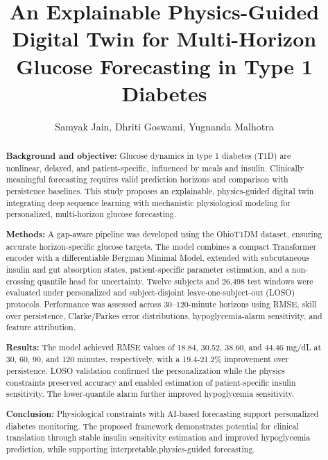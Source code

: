 \documentclass[journal]{IEEEtran}
\begin{document}
\raggedbottom

\title{An Explainable Physics-Guided Digital Twin for Multi-Horizon Glucose Forecasting in Type 1 Diabetes}

\author{
Samyak Jain,
Dhriti Goswami,
Yugnanda Malhotra
}

\maketitle

\begin{abstract}
\textbf{Background and objective:} Glucose dynamics in type 1 diabetes (T1D) are nonlinear, delayed, and patient-specific, influenced by meals and insulin. Clinically meaningful forecasting requires valid prediction horizons and comparison with persistence baselines. This study proposes an explainable, physics-guided digital twin integrating deep sequence learning with mechanistic physiological modeling for personalized, multi-horizon glucose forecasting.

\textbf{Methods:} A gap-aware pipeline was developed using the OhioT1DM dataset, ensuring accurate horizon-specific glucose targets. The model combines a compact Transformer encoder with a differentiable Bergman Minimal Model, extended with subcutaneous insulin and gut absorption states, patient-specific parameter estimation, and a non-crossing quantile head for uncertainty. Twelve subjects and 26,498 test windows were evaluated under personalized and subject-disjoint leave-one-subject-out (LOSO) protocols. Performance was assessed across 30–120-minute horizons using RMSE, skill over persistence, Clarke/Parkes error distributions, hypoglycemia-alarm sensitivity, and feature attribution.

\textbf{Results:} The model achieved RMSE values of 18.84, 30.52, 38.60, and 44.46 mg/dL at 30, 60, 90, and 120 minutes, respectively, with a 19.4-21.2\% improvement over persistence. LOSO validation confirmed the personalization while the physics constraints preserved accuracy and enabled estimation of patient-specific insulin sensitivity. The lower-quantile alarm further improved hypoglycemia sensitivity.

\textbf{Conclusion:} Physiological constraints with AI-based forecasting support personalized diabetes monitoring. The proposed framework demonstrates potential for clinical translation through stable insulin sensitivity estimation and improved hypoglycemia prediction, while supporting interpretable,physics-guided forecasting.
\end{abstract}
\end{document}
